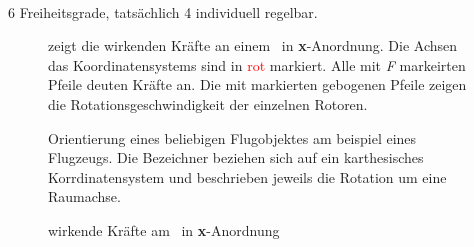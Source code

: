 






\missing\












6 Freiheitsgrade, tatsächlich 4 individuell regelbar.




\begin{figure}[ht!]
\vspace{0.25cm}
\begin{center}
\caption{wirkende Kräfte am \Quad\ in \textbf{x}-Anordnung }
\label{fig:Forces}
\end{center}

\vspace{0.25cm}
 zeigt die wirkenden Kräfte an einem \Quad\ in \textbf{x}-Anordnung. Die Achsen das Koordinatensystems sind in \textcolor{red}{rot} markiert. Alle mit \textit{F} markeirten Pfeile deuten Kräfte an. Die mit \missing[Omega] markierten gebogenen Pfeile zeigen die Rotationsgeschwindigkeit der einzelnen Rotoren.



 Orientierung eines beliebigen Flugobjektes am beispiel eines Flugzeugs. Die Bezeichner beziehen sich auf ein karthesisches Korrdinatensystem und beschrieben jeweils die Rotation um eine Raumachse.
\end{figure}







